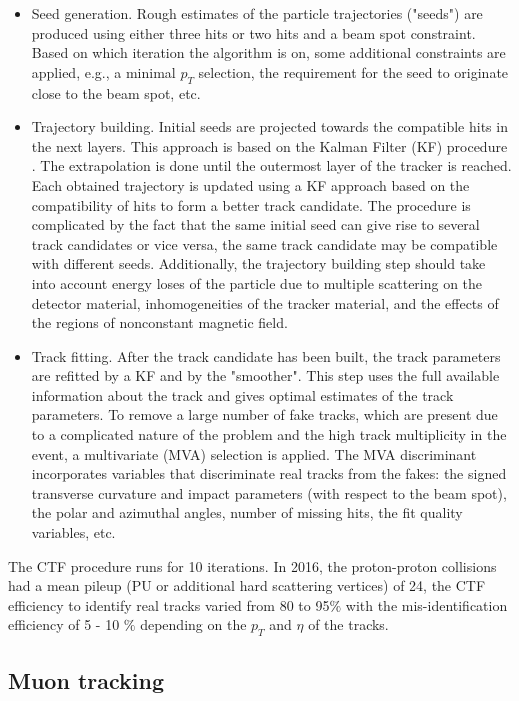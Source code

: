 \begin{itemize}
\item Seed generation. Rough estimates of the particle trajectories ("seeds") are produced using either three hits or two hits and a beam spot constraint. Based on which iteration the algorithm is on, some additional constraints are applied, e.g., a minimal $p_T$ selection, the requirement for the seed to originate close to the beam spot, etc. 
\item Trajectory building. Initial seeds are projected towards the compatible hits in the next layers. This approach is based on the Kalman Filter (KF) procedure \cite{Kalman_filter}. The extrapolation is done until the outermost layer of the tracker is reached. Each obtained trajectory is updated using a KF approach based on the compatibility of hits to form a better track candidate. The procedure is complicated by the fact that the same initial seed can give rise to several track candidates or vice versa, the same track candidate may be compatible with different seeds. Additionally, the trajectory building step should take into account energy loses of the particle due to multiple scattering on the detector material, inhomogeneities of the tracker material, and the effects of the regions of nonconstant magnetic field. 
\item Track fitting. After the track candidate has been built, the track parameters are refitted by a KF and by the "smoother". This step uses the full available information about the track and gives optimal estimates of the track parameters. To remove a large number of fake tracks, which are present due to a  complicated nature of the problem and the high track multiplicity in the event, a multivariate (MVA) selection is applied. The MVA discriminant incorporates variables that discriminate real tracks from the fakes: the signed transverse curvature and impact parameters (with respect to the beam spot), the polar and azimuthal angles, number of missing hits, the fit quality variables, etc. 
\end{itemize}

The CTF procedure runs for 10 iterations. In 2016, the proton-proton collisions had a mean pileup (PU or additional hard scattering vertices) of 24, the CTF efficiency to identify real tracks varied from 80 to 95$\%$ with the mis-identification efficiency of 5 - 10 $\%$ depending on the $p_T$ and $\eta$ of the tracks.

\subsection{Muon tracking}\label{sec:muon_track_reconstruction}

